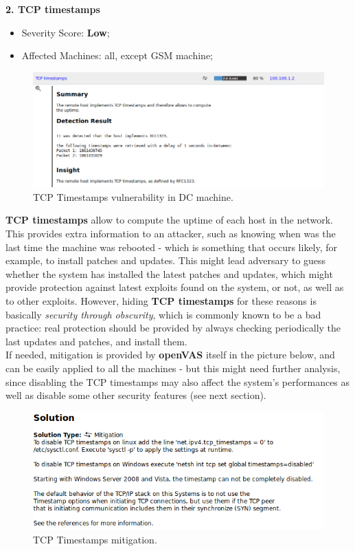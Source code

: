 \textbf{2. TCP timestamps}
\begin{itemize}
\item Severity Score: \textbf{Low};
\item Affected Machines: all, except GSM machine;
\end{itemize}
\begin{figure}[!htb]
\centering
\begin{minipage}{.5\textwidth}
  \centering
  \includegraphics[width=1\textwidth]{tcpTimestampsVuln.png}
  \caption[a]{TCP Timestamps vulnerability in DC machine.}\label{fig:15}
\end{minipage}%
\end{figure}
\textbf{TCP timestamps} allow to compute the uptime of each host in the network. This provides extra information to an attacker, such as knowing when was the last time the machine was rebooted - which is something that occurs likely, for example, to install patches and updates. This might lead adversary to guess whether the system has installed the latest patches and updates, which might provide protection against latest exploits found on the system, or not, as well as to other exploits. However, hiding \textbf{TCP timestamps} for these reasons is basically \textit{security through obscurity}, which is commonly known to be a bad practice: real protection should be provided by always checking periodically the last updates and patches, and install them.\\
If needed, mitigation is provided by \textbf{openVAS} itself in the picture below, and can be easily applied to all the machines - but this might need further analysis, since disabling the TCP timestamps may also affect the system's performances as well as disable some other security features (see next section).\\
\begin{figure}[!htb]
\centering
\begin{minipage}{.7\textwidth}
  \centering
  \includegraphics[width=1\textwidth]{tcpTimestampsVulnMitigation.png}
  \caption[a]{TCP Timestamps mitigation.}\label{fig:16}
\end{minipage}%
\end{figure}
